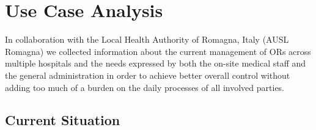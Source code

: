
\section{Use Case Analysis}


In collaboration with the Local Health Authority of Romagna, Italy (AUSL Romagna) we collected information about the current management of ORs across multiple hospitals and the needs expressed by both the on-site medical staff and the general administration in order to achieve better overall control without adding too much of a burden on the daily processes of all involved parties.

\subsection{Current Situation}

